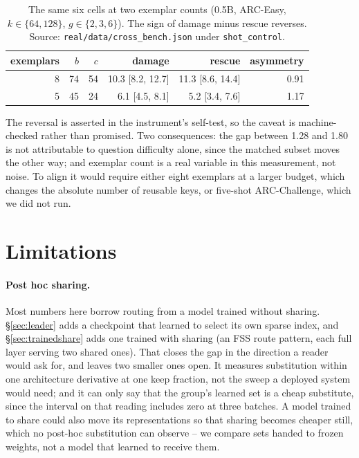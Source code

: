 \documentclass[10pt]{article}
\begin{document}
\begin{table}[h]
\centering
\caption{The same six cells at two exemplar counts (0.5B, ARC-Easy,
$k \in \{64,128\}$, $g \in \{2,3,6\}$). The sign of damage minus rescue
reverses. Source: \texttt{real/data/cross\_bench.json} under
\texttt{shot\_control}.}
\label{tab:shots}
\begin{tabular}{rrrrrr}
\toprule
exemplars & $b$ & $c$ & damage & rescue & asymmetry \\
\midrule
8 & 74 & 54 & 10.3 [8.2, 12.7] & 11.3 [8.6, 14.4] & 0.91 \\
5 & 45 & 24 & 6.1 [4.5, 8.1] & 5.2 [3.4, 7.6] & 1.17 \\
\bottomrule
\end{tabular}
\end{table}

The reversal is asserted in the instrument's self-test, so the caveat is
machine-checked rather than promised. Two consequences: the gap between
1.28 and 1.80 is not attributable to question difficulty alone, since the
matched subset moves the other way; and exemplar count is a real variable
in this measurement, not noise. To align it would require either eight exemplars
at a larger budget, which changes the absolute number of reusable keys, or
five-shot ARC-Challenge, which we did not run.

\section{Limitations}
\label{sec:limits}

\paragraph{Post hoc sharing.} Most numbers here borrow routing from a model
trained without sharing. \S\ref{sec:leader} adds a checkpoint that learned to
select its own sparse index, and \S\ref{sec:trainedshare} adds one trained with
sharing (an FSS route pattern, each full layer serving two shared ones). That
closes the gap in the direction a reader would ask for, and leaves two smaller
ones open. It measures substitution within one architecture derivative at one
keep fraction, not the sweep a deployed system would need; and it can only say
that the group's learned set is a cheap substitute, since the interval on that
reading includes zero at three batches. A model trained to share could also move
its representations so that sharing becomes cheaper still, which no post-hoc
substitution can observe -- we compare sets handed to frozen weights, not a
model that learned to receive them.
\end{document}
